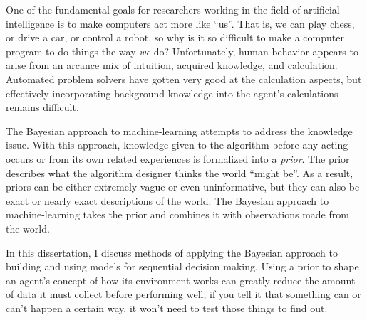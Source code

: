 
One of the fundamental goals for researchers working in the field of artificial intelligence is to make computers act more like ``us''. That is, we can play chess, or drive a car, or control a robot, so why is it so difficult to make a computer program to do things the way \emph{we} do? Unfortunately, human behavior appears to arise from an arcance mix of intuition, acquired knowledge, and calculation. Automated problem solvers have gotten very good at the calculation aspects, but effectively incorporating background knowledge into the agent's calculations remains difficult.

The Bayesian approach to machine-learning attempts to address the knowledge issue. With this approach, knowledge given to the algorithm before any acting occurs or from its own related experiences is formalized into a \emph{prior}. The prior describes what the algorithm designer thinks the world ``might be''. As a result, priors can be either extremely vague or even uninformative, but they can also be exact or nearly exact descriptions of the world. The Bayesian approach to machine-learning takes the prior and combines it with observations made from the world.

In this dissertation, I discuss methods of applying the Bayesian approach to building and using models for sequential decision making. Using a prior to shape an agent's concept of how its environment works can greatly reduce the amount of data it must collect before performing well; if you tell it that something can or can't happen a certain way, it won't need to test those things to find out.

